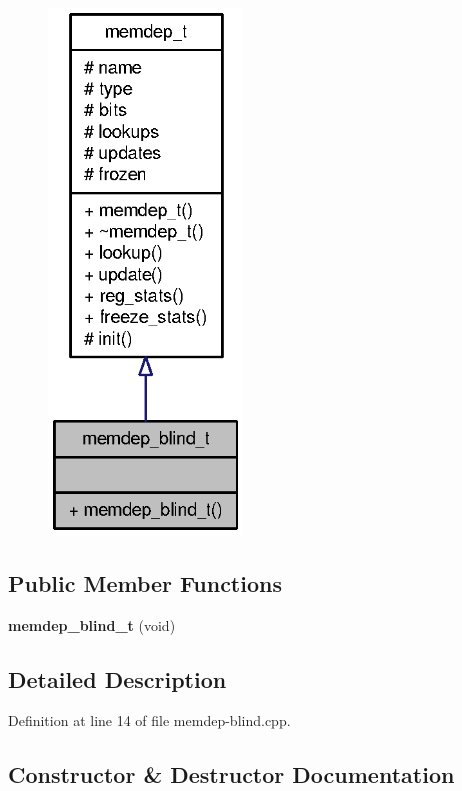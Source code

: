 \begin{figure}[H]
\begin{center}
\leavevmode
\includegraphics[width=146pt]{classmemdep__blind__t__coll__graph}
\end{center}
\end{figure}
\subsection*{Public Member Functions}
\begin{CompactItemize}
\item 
{\bf memdep\_\-blind\_\-t} (void)
\end{CompactItemize}


\subsection{Detailed Description}


Definition at line 14 of file memdep-blind.cpp.

\subsection{Constructor \& Destructor Documentation}
